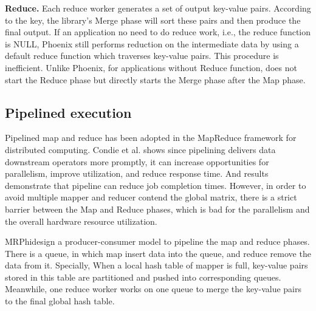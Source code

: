 {\bf Reduce.}
Each reduce worker generates a set of output key-value pairs.
According to the key, the library's Merge phase  will sort these pairs and then produce the final output. 
If an application no need to do reduce work, i.e., the reduce function is NULL,
Phoenix still performs reduction on the intermediate data by using a default reduce function which traverses key-value pairs. 
This procedure is inefficient. 
Unlike Phoenix, for applications without Reduce function, \myds does not start the Reduce phase but directly starts the Merge phase after the Map phase.


\subsection{Pipelined execution}
Pipelined map and reduce has been adopted 
in the MapReduce framework for distributed computing\cite{Condie2010mapreduce}. 
Condie et al. shows since pipelining delivers data downstream operators
more promptly, it can increase opportunities for
parallelism, improve utilization, and reduce response
time.
And results demonstrate that pipeline can reduce job completion times.
However, in order to avoid multiple mapper and reducer contend the global matrix,
there is a strict barrier between the Map and Reduce phases,
which is bad for the parallelism and the overall hardware resource utilization.


MRPhi\cite{lu2013mrphi}design a producer-consumer model 
to pipeline the map and reduce phases.
There is a queue, in which map insert data into the queue, and reduce remove the data from it. 
Specially, When a local hash table of mapper is full,
key-value pairs stored in this table are partitioned and
pushed into corresponding queues. 
Meanwhile, one reduce worker works on one queue to merge the key-value pairs to
the final global hash table. 

